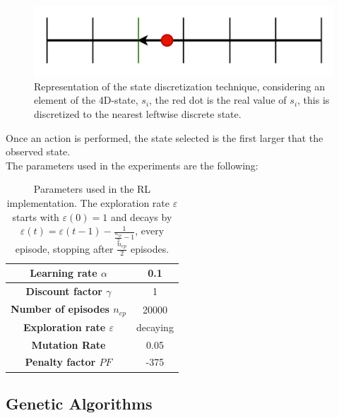 \begin{figure}[H]
	\centering
	\includegraphics [scale = 0.2]{Images/state_discretization.png}
	\caption{Representation of the state discretization technique, considering an element of the 4D-state, $s_i$, the red dot is the real value of $s_i$, this is discretized to the nearest leftwise discrete state.}
	\label{figDISC}
\end{figure}

Once an action is performed, the state selected is the first larger that the observed state.\\
The parameters used in the experiments are the following:


\begin{table}[htb]%
	\centering
	\label{tab:RL_parameters}
	\begin{tabular}{|S|S|} 		%
		
		\hline
		{\textbf{Learning rate $\alpha$}} &  {0.1} \\
		\hline
		{\textbf{Discount factor $\gamma$}} & {1} \\
		\hline
		{\textbf{Number of episodes $n_{ep}$}} & {20000} \\
		\hline
		{\textbf{Exploration rate $\varepsilon$}}  & {decaying} \\
		\hline
		{\textbf{Mutation Rate}} & {0.05} \\
		\hline
		{\textbf{Penalty factor $PF$}}& {-375} \\
		\hline
		
	\end{tabular}
	\caption{Parameters used in the RL implementation. The exploration rate $\varepsilon$ starts with $\varepsilon(0)=1$ and decays by $\varepsilon(t) = \varepsilon(t - 1) - \frac{1}{\frac{n_{ep}}{2} - 1}$, every episode, stopping after $\frac{n_{ep}}{2}$ episodes. }
\end{table}



\subsection{Genetic Algorithms}

